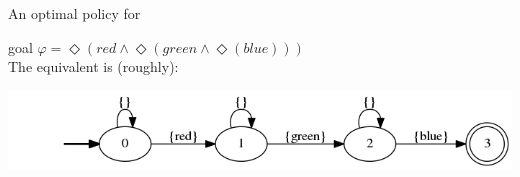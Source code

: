 \documentclass{beamer}
\begin{document}
\begin{frame}{An optimal policy for \Sapientino}
	
	\LTLf goal $\varphi = \Diamond (red \land \Diamond (green \land \Diamond(blue)))$\\
	The equivalent \DFA is (roughly):
	
	\begin{center}
		\includegraphics[width=\textwidth]{images//sapientino-simple-dfa-horizontal}
	\end{center}
	

\end{frame}
\end{document}
